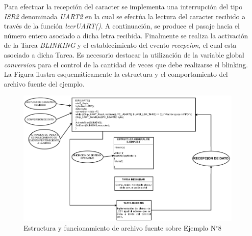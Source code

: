 \documentclass[12pt,letterpaper]{article}
\begin{document}
Para efectuar la recepción del caracter se implementa una interrupción del tipo \textit{ISR2} denominada \textit{UART2} en la cual se efectúa la lectura del caracter recibido a través de la función \textit{leerUART()}. A continuación, se produce el pasaje hacia el número entero asociado a dicha letra recibida. Finalmente se realiza la activación de la Tarea \textit{BLINKING} y el establecimiento del evento \textit{recepcion}, el cual esta asociado a dicha Tarea. Es necesario destacar la utilización de la variable global \textit{conversion} para el control de la cantidad de veces que debe realizarse el blinking. La Figura  ilustra esquemáticamente la estructura y el comportamiento del archivo fuente del ejemplo.
\begin{center}
\begin{figure}[H]
\centering
\includegraphics[width=15 cm]{figuras/f39.png}
\caption{Estructura y funcionamiento de archivo fuente sobre Ejemplo N$^{\circ}$8}
\label{Fig46}
\end{figure}
\end{center}
\end{document}
